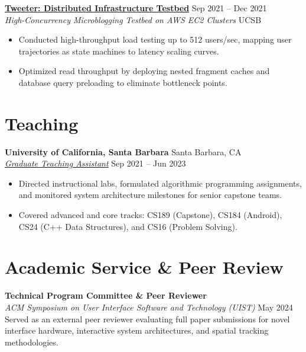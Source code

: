 \documentclass[10pt,letterpaper]{article}
\begin{document}
\noindent
\textbf{\href{https://satyam-aw.github.io/projects/tweeter/}{Tweeter: Distributed Infrastructure Testbed}} \hfill Sep 2021 – Dec 2021  \\
\textit{High-Concurrency Microblogging Testbed on AWS EC2 Clusters} \hfill UCSB
\begin{itemize}
    \item Conducted high-throughput load testing up to 512 users/sec, mapping user trajectories as state machines to latency scaling curves.
    \item Optimized read throughput by deploying nested fragment caches and database query preloading to eliminate bottleneck points.
\end{itemize}


\section*{Teaching}
\noindent
\textbf{University of California, Santa Barbara} \hfill Santa Barbara, CA \\
\textit{\href{https://satyam-aw.github.io/teaching/}{Graduate Teaching Assistant}} \hfill Sep 2021 – Jun 2023
\begin{itemize}
    \item Directed instructional labs, formulated algorithmic programming assignments, and monitored system architecture milestones for senior capstone teams.
    \item Covered advanced and core tracks: CS189 (Capstone), CS184 (Android), CS24 (C++ Data Structures), and CS16 (Problem Solving).
\end{itemize}


\section*{Academic Service \& Peer Review}

\noindent
\textbf{Technical Program Committee \& Peer Reviewer} \\
\textit{ACM Symposium on User Interface Software and Technology (UIST)} \hfill May 2024 \\
Served as an external peer reviewer evaluating full paper submissions for novel interface hardware, interactive system architectures, and spatial tracking methodologies.

\clearpage
\end{document}
